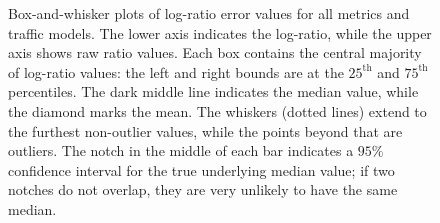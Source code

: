 \documentclass[twocolumn,final]{svjour3}
\begin{document}
\begin{figure}
%
\hfill
{}%
%
\caption{%
Box-and-whisker plots of log-ratio error values for all metrics and traffic models. The lower axis indicates the log-ratio, while the upper axis shows raw ratio values. Each box contains the central majority of log-ratio values: the left and right bounds are at the $25^\text{th}$ and $75^\text{th}$ percentiles. The dark middle line indicates the median value, while the diamond marks the mean. The whiskers (dotted lines) extend to the furthest non-outlier values, while the points beyond that are outliers. The notch in the middle of each bar indicates a $95\%$ confidence interval for the true underlying median value; if two notches do not overlap, they are very unlikely to have the same median.
}
\label{fig:box-plots}
\end{figure}
\end{document}

